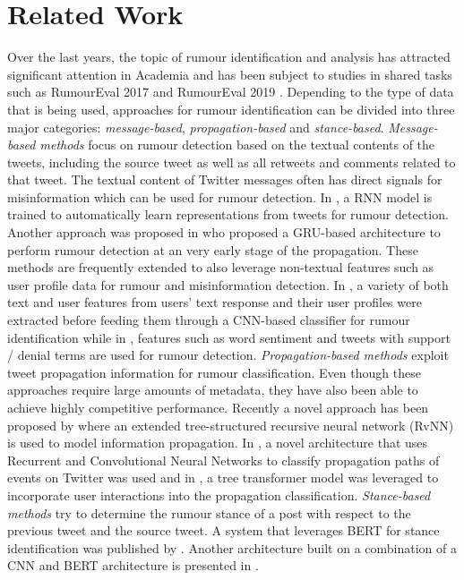 \documentclass[11pt,a4paper]{article}
\begin{document}
\section{Related Work}
Over the last years, the topic of rumour identification and analysis has attracted significant attention in Academia and has been subject to studies in shared tasks such as RumourEval 2017 \citep{RN690} and RumourEval 2019 \citep{RN691}.
Depending to the type of data that is being used, approaches for rumour identification can be divided into three major categories: \textit{message-based}, \textit{propagation-based} and \textit{stance-based}.
\newline
\textit{Message-based methods} focus on rumour detection based on the textual contents of the tweets, including the source tweet as well as all retweets and comments related to that tweet. The textual content of Twitter messages often has direct signals for misinformation which can be used for rumour detection. In \citet{RN676}, a RNN model is trained to automatically learn representations from tweets for rumour detection. Another approach was proposed in \citet{RN671} who proposed a GRU-based architecture to perform rumour detection at an very early stage of the propagation.
These methods are frequently extended to also leverage non-textual features such as user profile data for rumour and misinformation detection. In \citet{RN673}, a variety of both text and user features from users’ text response and their user profiles were extracted before feeding them through a CNN-based classifier for rumour identification while in \citet{RN481}, features such as word sentiment and tweets with support / denial terms are used for rumour detection.
\newline
\textit{Propagation-based methods} exploit tweet propagation information for rumour classification. Even though these approaches require large amounts of metadata, they have also been able to achieve highly competitive performance.
Recently a novel approach has been proposed by \citet{RN679} where an extended tree-structured recursive neural network (RvNN) is used to model information propagation. 
In \citet{RN672}, a novel architecture that uses Recurrent and Convolutional Neural Networks to classify propagation paths of events on Twitter was used and in \citet{RN669}, a tree transformer model was leveraged to incorporate user interactions into the propagation classification.
\newline
\textit{Stance-based methods} try to determine the rumour stance of a post with respect to the previous tweet and the source tweet. A system that leverages BERT for stance identification was published by \citet{RN665}. Another architecture built on a combination of a CNN and BERT architecture is presented in \citet{RN480}.
\end{document}
